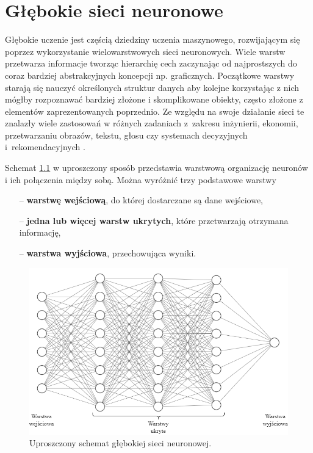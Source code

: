 \chapter{Głębokie sieci neuronowe}
\label{roz2}

\hspace{0.4cm}
Głębokie uczenie jest częścią dziedziny uczenia maszynowego, rozwijającym się poprzez wykorzystanie wielowarstwowych sieci neuronowych. Wiele warstw przetwarza informacje tworząc hierarchię cech zaczynając od najprostszych do coraz bardziej abstrakcyjnych koncepcji np. graficznych. Początkowe warstwy starają się nauczyć określonych struktur danych aby kolejne korzystając z nich mógłby rozpoznawać bardziej złożone i skomplikowane obiekty, często złożone z elementów zaprezentowanych poprzednio. Ze względu na swoje działanie sieci te znalazły wiele zastosowań w różnych zadaniach z~zakresu inżynierii, ekonomii, przetwarzaniu obrazów, tekstu, głosu czy systemach decyzyjnych i~rekomendacyjnych \cite{OsowskiSieci}.

Schemat \ref{fig:schematsieci} w uproszczony sposób przedstawia warstwową organizację neuronów i ich połączenia między sobą. Można wyróżnić trzy podstawowe warstwy

\begin{itemize}
    \item[--] \textbf{warstwę wejściową}, do której dostarczane są dane wejściowe,
    \item[--] \textbf{jedna lub więcej warstw ukrytych}, które przetwarzają otrzymana informację,
    \item[--] \textbf{warstwa wyjściowa}, przechowująca wyniki.
\end{itemize}

\begin{figure}[H]
    \centering
    \includegraphics[width=0.9\linewidth]{Obrazy/Rozdzial02/schematsieci.png}
    \caption{Uproszczony schemat głębokiej sieci neuronowej.}
    \label{fig:schematsieci}
\end{figure}


